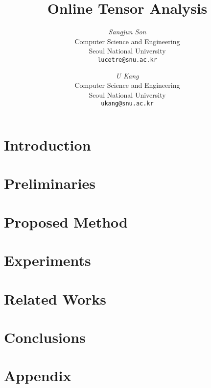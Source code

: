 \documentclass[10pt]{article}
\begin{document}
\newcommand{\beq}{\begin{equation}}
\newcommand{\eeq}{\end{equation}}
\newcommand{\bit}{\begin{itemize*}}
\newcommand{\eit}{\end{itemize*}}
\newcommand{\goal}[1]{ {\noindent {$\Rightarrow$} \em {#1} } }
\newcommand{\hide}[1]{}
\newcommand{\comment}[1]{ {\footnotesize {#1} } }
\newtheorem{lemma}{Lemma}
\newtheorem{theorem}{Theorem}
\newtheorem{proof}{Proof}
\newtheorem{defn}{Definition}
\newtheorem{algo}{Algorithm}
\newtheorem{observation}{Observation}

\title{Online Tensor Analysis}

\author{ {\em Sangjun Son} \\
	    Computer Science and Engineering \\
	    Seoul National University\\
	    {\tt lucetre@snu.ac.kr}
	 \and
	 {\em U Kang} \\
	    Computer Science and Engineering \\
	    Seoul National University\\
	     {\tt ukang@snu.ac.kr}
        }


\maketitle
\begin{abstract}
    
\end{abstract}

\section{Introduction}
    \label{sec:intro}
    

\section{Preliminaries}
    \label{sec:prelim}
    
    
\newpage
\section{Proposed Method}
    \label{sec:proposed}
  	

\section{Experiments}
    \label{sec:experiments}
    
    
\section{Related Works}
    \label{sec:related}
        

\section{Conclusions}
    \label{sec:conclusions}
    





\newpage
\appendix
\section{Appendix}

\end{document}
